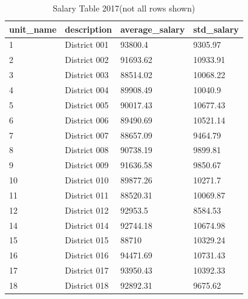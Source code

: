 \documentclass{article}
\begin{document}
\begin{table}[h]
\centering
\caption{Salary Table 2017(not all rows shown)}
\begin{tabular}{|l|l|l|l|}
\hline
unit\_name & description                             & average\_salary & std\_salary \\
\hline
1          & District 001                                          & 93800.4         & 9305.97     \\
2          & District 002                                          & 91693.62        & 10933.91    \\
3          & District 003                                          & 88514.02        & 10068.22    \\
4          & District 004                                          & 89908.49        & 10040.9     \\
5          & District 005                                          & 90017.43        & 10677.43    \\
6          & District 006                                          & 89490.69        & 10521.14    \\
7          & District 007                                          & 88657.09        & 9464.79     \\
8          & District 008                                          & 90738.19        & 9899.81     \\
9          & District 009                                          & 91636.58        & 9850.67     \\
10         & District 010                                          & 89877.26        & 10271.7     \\
11         & District 011                                          & 88520.31        & 10069.87    \\
12         & District 012                                          & 92953.5         & 8584.53     \\
14         & District 014                                          & 92744.18        & 10674.98    \\
15         & District 015                                          & 88710           & 10329.24    \\
16         & District 016                                          & 94471.69        & 10731.43    \\
17         & District 017                                          & 93950.43        & 10392.33    \\
18         & District 018                                          & 92892.31        & 9675.62     \\

\end{tabular}
\end{table}
\end{document}
